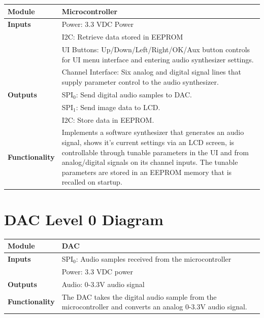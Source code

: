 \documentclass{article}
\begin{document}
\begin{tabular}{|p{1in}|p{5in}|}
\hline
\textbf{Module} & Microcontroller \\
\hline
\textbf{Inputs}& Power: 3.3 VDC Power\\
	     & I2C: Retrieve data stored in EEPROM\\
	     & UI Buttons: Up/Down/Left/Right/OK/Aux button controls for UI menu interface and entering audio synthesizer settings.\\
	     & Channel Interface: Six analog and digital signal lines that supply parameter control to the audio synthesizer.\\
\hline
\textbf{Outputs}& SPI$_0$: Send digital audio samples to DAC.\\
	      & SPI$_1$: Send image data to LCD.\\
	      & I2C: Store data in EEPROM.\\ 
\hline
\textbf{Functionality}& Implements a software synthesizer that generates an audio signal, shows it's current settings via an LCD screen, is controllable through tunable parameters in the UI and from analog/digital signals on its channel inputs. The tunable parameters are stored in an EEPROM memory that is recalled on startup.\\
\hline
\end{tabular}

\section{DAC Level 0 Diagram}

\begin{tabular}{|p{1in}|p{5in}|}
\hline
\textbf{Module} & DAC \\
\hline
\textbf{Inputs}& SPI$_0$: Audio samples received from the microcontroller\\
	     & Power: 3.3 VDC power\\
\hline
\textbf{Outputs}& Audio: 0-3.3V audio signal \\ 
\hline
\textbf{Functionality}& The DAC takes the digital audio sample from the microcontroller and converts an analog 0-3.3V audio signal.\\
\hline
\end{tabular}
\end{document}
